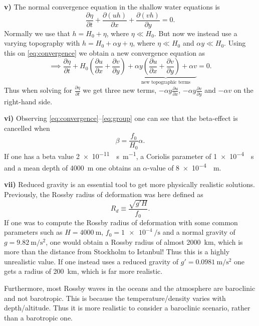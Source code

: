 \textbf{v)} The normal convergence equation in the shallow water equations is 
\begin{equation}
    \frac{\partial \eta}{\partial t} + \frac{\partial (uh)}{\partial x} + \frac{\partial (vh)}{\partial y} = 0.
\label{eq:convergence}
\end{equation}
Normally we use that $h=H_0+\eta$, where $\eta\ll H_0$. But now we instead use a varying topography with $h=H_0+\alpha y + \eta$, where $\eta\ll H_0$ and $\alpha y \ll H_0$. Using this on \autoref{eq:convergence} we obtain a new convergence equation as
\begin{equation}
\implies
\frac{\partial \eta}{\partial t}
+
H_0
\left(
\frac{\partial u}{\partial x}
+
\frac{\partial v}{\partial y}
\right)
+
\underbrace{
\alpha y
\left(
\frac{\partial u}{\partial x}
+
\frac{\partial v}{\partial y}
\right) +\alpha v
}_{\text{new topographic terms}}
=0.
\end{equation}
Thus when solving for $\tfrac{\partial \eta}{\partial t}$ we get three new terms, $-\alpha y\frac{\partial u}{\partial x}$, $-\alpha y \frac{\partial v}{\partial y}$ and $-\alpha v$ on the right-hand side. 


\textbf{vi)} Observing \autoref{eq:convergence}--\ref{eq:group} one can see that the beta-effect is cancelled when 
\begin{equation}
    \beta=\frac{f_0}{H_0}{\alpha}.
\end{equation}
If one has a beta value \SI{2e-11}{\per\second\per\meter}, a Coriolis parameter of \SI{1e-4}{\per\second} and a mean depth of \SI{4000}{\meter} one obtains an $\alpha$-value of \SI{8e-4}{\per\meter}.

\newpage
\textbf{vii)} Reduced gravity is an essential tool to get more physically realistic solutions. Previously, the Rossby radius of deformation was here defined as 
$$R_d\equiv \frac{\sqrt{g\prime H}}{f_0}.$$
If one was to compute the Rossby radius of deformation with some common parameters such as $H=\SI{4000}{\meter}$, $f_0=\SI{1e-4}{\per\second}$ and a normal gravity of $g=\SI{9.82}{\meter\per\second\squared}$, one would obtain a Rossby radius of almost \SI{2000}{\kilo\meter}, which is more than the distance from Stockholm to Istanbul! Thus this is a highly unrealistic value. If one instead uses a reduced gravity of $g\prime=\SI{0.0981}{\meter\per\second\squared}$ one gets a radius of \SI{200}{\kilo\meter}, which is far more realistic.

Furthermore, most Rossby waves in the oceans and the atmosphere are baroclinic and not barotropic. This is because the temperature/density varies with depth/altitude. Thus it is more realistic to consider a baroclinic scenario, rather than a barotropic one. 
